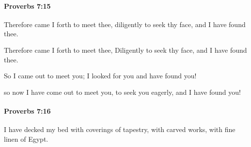 		\paragraph{Proverbs 7:15} %
			\label{PROVERBS-7-15}

			Therefore came I forth to meet thee, diligently to seek thy face, and I have found thee.

			\begin{versebox}
					\item[BHS] 
					\item[ASV] Therefore came I forth to meet thee, Diligently to seek thy face, and I have found thee.
					\item[NIV] So I came out to meet you; I looked for you and have found you!
					\item[NRSV] so now I have come out to meet you, to seek you eagerly, and I have found you!
			\end{versebox}

		\paragraph{Proverbs 7:16} %
			\label{PROVERBS-7-16}

			I have decked my bed with coverings of tapestry, with carved works, with fine linen of Egypt.

